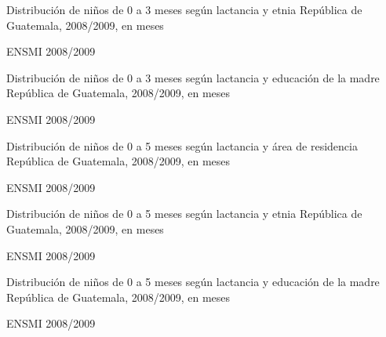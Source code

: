 %
{%
}%
{%
	Distribución de niños de 0 a 3 meses según lactancia y etnia
} %
{%
	República de Guatemala, 2008/2009, en meses} %
{%
	\begin{tikzpicture}[x=1pt,y=1pt]    \end{tikzpicture}
}%
{%
	ENSMI 2008/2009} %



%
{%
}%
{%
	Distribución de niños de 0 a 3 meses según lactancia y educación de la madre
} %
{%
	República de Guatemala, 2008/2009, en meses} %
{%
	\begin{tikzpicture}[x=1pt,y=1pt]    \end{tikzpicture}
}%
{%
	ENSMI 2008/2009} %


%
{%
}%
{%
	Distribución de niños de 0 a 5 meses según lactancia y área de residencia
} %
{%
	República de Guatemala, 2008/2009, en meses} %
{%
	\begin{tikzpicture}[x=1pt,y=1pt]    \end{tikzpicture}
}%
{%
	ENSMI 2008/2009} %



%
{%
}%
{%
	Distribución de niños de 0 a 5 meses según lactancia y etnia
} %
{%
	República de Guatemala, 2008/2009, en meses} %
{%
	\begin{tikzpicture}[x=1pt,y=1pt]    \end{tikzpicture}
}%
{%
	ENSMI 2008/2009} %



%
{%
}%
{%
	Distribución de niños de 0 a 5 meses según lactancia y educación de la madre
} %
{%
	República de Guatemala, 2008/2009, en meses} %
{%
	\begin{tikzpicture}[x=1pt,y=1pt]    \end{tikzpicture}
}%
{%
	ENSMI 2008/2009} %